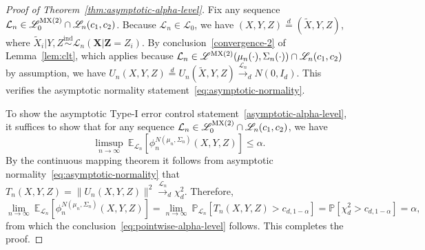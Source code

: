 \documentclass[ejs]{imsart}
\numberwithin{equation}{section}
\theoremstyle{plain}
\theoremstyle{definition}
\theoremstyle{remark}
\newcommand{\prx}{\bm X}
\newcommand{\srx}{X}
\newcommand{\prz}{\bm Z}
\newcommand{\srz}{Z}
\newcommand{\srxk}{\widetilde X}
\newcommand{\sry}{Y}
\begin{document}
\begin{proof}[Proof of Theorem~\ref{thm:asymptotic-alpha-level}]

Fix any sequence $\mathcal L_n \in \mathscr L_0^{\textnormal{MX(2)}}\cap \mathscr L_n(c_1, c_2)$. Because $\mathcal L_n \in \mathscr L_0$, we have $(\srx, \sry, \srz) \overset d = (\srxk, \sry, \srz)$, where $\srxk_i|\sry,\srz \overset{\text{ind}}\sim \mathcal L_n(\prx|\prz = \srz_i)$. By conclusion~\eqref{convergence-2} of Lemma~\ref{lem:clt}, which applies because $\mathcal L_n \in \mathscr L^{\textnormal{MX(2)}}(\mu_n(\cdot), \Sigma_n(\cdot)) \cap \mathscr L_n(c_1, c_2)$ by assumption, we have $U_n(\srx, \sry,\srz) \overset d = U_n(\srxk, \sry,\srz) \overset{\mathcal L_n}\rightarrow_d N(0, I_d)$. This verifies the asymptotic normality statement~\eqref{eq:asymptotic-normality}.

To show the asymptotic Type-I error control statement~\eqref{asymptotic-alpha-level}, it suffices to show that for any sequence $\mathcal L_n \in \mathscr L_0^{\textnormal{MX(2)}}\cap \mathscr L_n(c_1, c_2)$, we have
	\begin{equation}
		\limsup_{n \rightarrow \infty}\ \mathbb E_{\mathcal L_n}[\phi^{N(\mu_n, \Sigma_n)}_n(\srx, \sry, \srz)] \leq \alpha.
	\label{eq:pointwise-alpha-level}
	\end{equation}
By the continuous mapping theorem it follows from asymptotic normality~\eqref{eq:asymptotic-normality} that $T_n(\srx,\sry,\srz) = \|U_n(\srx, \sry,\srz)\|^2 \overset{\mathcal L_n}\rightarrow_d \chi^2_d$. Therefore,
	\begin{equation*}
		\lim_{n \rightarrow \infty}\ \mathbb E_{\mathcal L_n}[\phi^{N(\mu_n, \Sigma_n)}_n(\srx, \sry, \srz)] = \lim_{n \rightarrow \infty}\ \mathbb P_{\mathcal L_n}[T_n(\srx,\sry,\srz) > c_{d,1-\alpha}] = \mathbb P[\chi^2_d > c_{d,1-\alpha}] = \alpha,
	\end{equation*}
	from which the conclusion~\eqref{eq:pointwise-alpha-level} follows. This completes the proof.
\end{proof}
\end{document}
